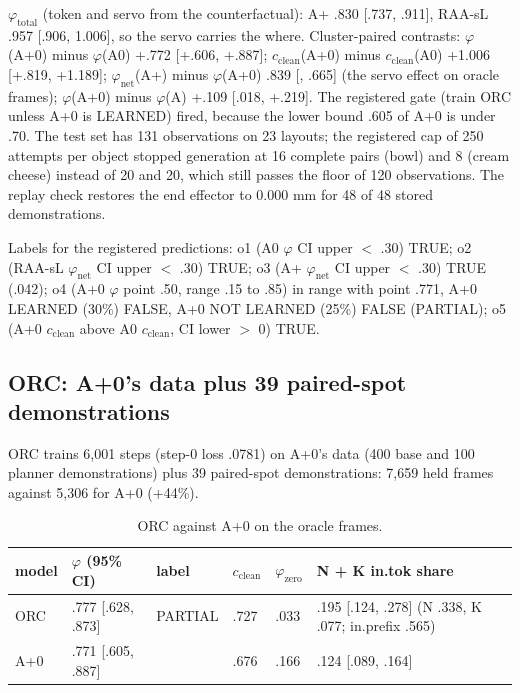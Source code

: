 $\varphi_{\mathrm{total}}$ (token and servo from the counterfactual): A+ .830 [.737, .911], RAA-sL .957 [.906, 1.006], so the servo carries the where. Cluster-paired contrasts: $\varphi$(A+0) minus $\varphi$(A0) +.772 [+.606, +.887]; $c_{\mathrm{clean}}$(A+0) minus $c_{\mathrm{clean}}$(A0) +1.006 [+.819, +1.189]; $\varphi_{\mathrm{net}}$(A+) minus $\varphi$(A+0) \mi.839 [, \mi.665] (the servo effect on oracle frames); $\varphi$(A+0) minus $\varphi$(A) +.109 [\mi.018, +.219]. The registered gate (train ORC unless A+0 is LEARNED) fired, because the lower bound .605 of A+0 is under .70. The test set has 131 observations on 23 layouts; the registered cap of 250 attempts per object stopped generation at 16 complete pairs (bowl) and 8 (cream cheese) instead of 20 and 20, which still passes the floor of 120 observations. The replay check restores the end effector to 0.000 mm for 48 of 48 stored demonstrations.

Labels for the registered predictions: o1 (A0 $\varphi$ CI upper $<$ .30) TRUE; o2 (RAA-sL $\varphi_{\mathrm{net}}$ CI upper $<$ .30) TRUE; o3 (A+ $\varphi_{\mathrm{net}}$ CI upper $<$ .30) TRUE (.042); o4 (A+0 $\varphi$ point .50, range .15 to .85) in range with point .771, A+0 LEARNED (30\%) FALSE, A+0 NOT LEARNED (25\%) FALSE (PARTIAL); o5 (A+0 $c_{\mathrm{clean}}$ above A0 $c_{\mathrm{clean}}$, CI lower $>$ 0) TRUE.

\subsection{ORC: A+0's data plus 39 paired-spot demonstrations}
\label{app:K2}

ORC trains 6,001 steps (step-0 loss .0781) on A+0's data (400 base and 100 planner demonstrations) plus 39 paired-spot demonstrations: 7,659 held frames against 5,306 for A+0 (+44\%).

\begin{table}[h]
\caption{ORC against A+0 on the oracle frames.}
\label{tab:K2}
\centering
\footnotesize
\begin{tabular}{@{}llllll@{}}
\toprule
model & $\varphi$ (95\% CI) & label & $c_{\mathrm{clean}}$ & $\varphi_{\mathrm{zero}}$ & N + K in.tok share \\
\midrule
ORC & .777 [.628, .873] & PARTIAL & .727 & .033 & .195 [.124, .278] (N .338, K .077; in.prefix .565) \\
A+0 & .771 [.605, .887] & & .676 & .166 & .124 [.089, .164] \\
\bottomrule
\end{tabular}
\end{table}

